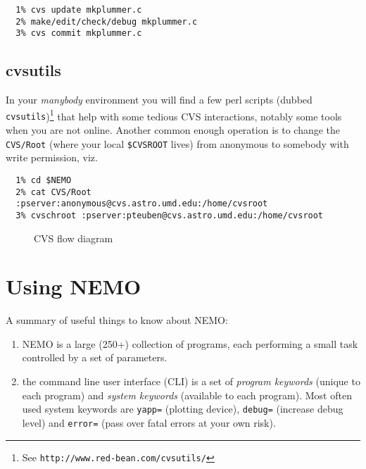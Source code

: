 \begin{itemize}
\begin{itemize}
\begin{enumerate}
\footnotesize\begin{verbatim}
  1% cvs update mkplummer.c
  2% make/edit/check/debug mkplummer.c
  3% cvs commit mkplummer.c
\end{verbatim}\normalsize


\end{enumerate}

\section{cvsutils}

In your {\it manybody} environment you will find a few perl scripts
(dubbed {\tt cvsutils})\footnote{See {\tt http://www.red-bean.com/cvsutils/}}
that help with some tedious CVS interactions, notably some tools when
you are not online. Another common enough operation is to change the 
{\tt CVS/Root}
(where your local {\tt \$CVSROOT} lives) from anonymous to somebody with
write permission, viz.

\footnotesize\begin{verbatim}
  1% cd $NEMO
  2% cat CVS/Root
  :pserver:anonymous@cvs.astro.umd.edu:/home/cvsroot
  3% cvschroot :pserver:pteuben@cvs.astro.umd.edu:/home/cvsroot
\end{verbatim}\normalsize

\begin{figure}[htb]
\caption[CVS diagram]
{CVS flow diagram}
\label{f:cvs}
\end{figure}



\chapter                {Using NEMO}

A summary of useful things to know about NEMO:
\begin{enumerate}

\item
NEMO is a large (250+) collection of programs, each performing a small task
controlled by a set of parameters.

\item
the command line user interface (CLI) is a set of {\it program keywords}
(unique to each program) and {\it system keywords}
(available to each program).
Most often used system keywords are {\tt yapp=} (plotting device),
{\tt debug=} (increase debug level) and {\tt error=} (pass over fatal errors
at your own risk).


\end{enumerate}
\end{itemize}
\end{itemize}
